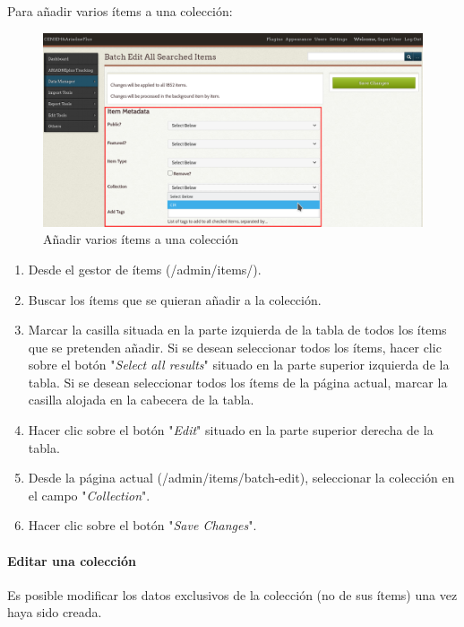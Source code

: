 \documentclass[
]{article}
\providecommand{\tightlist}{%
  \setlength{\itemsep}{0pt}\setlength{\parskip}{0pt}}
\begin{document}
Para añadir varios ítems a una colección:

\begin{figure}
\hypertarget{add-items-collection}{%
\centering
\includegraphics{../_static/images/add-items-collection.png}
\caption{Añadir varios ítems a una
colección}\label{add-items-collection}
}
\end{figure}

\begin{enumerate}
\def\labelenumi{\arabic{enumi}.}
\tightlist
\item
  Desde el gestor de ítems ({/admin/items/}).
\item
  Buscar los ítems que se quieran añadir a la colección.
\item
  Marcar la casilla situada en la parte izquierda de la tabla de todos
  los ítems que se pretenden añadir. Si se desean seleccionar todos los
  ítems, hacer clic sobre el botón "\emph{Select all results}" situado
  en la parte superior izquierda de la tabla. Si se desean seleccionar
  todos los ítems de la página actual, marcar la casilla alojada en la
  cabecera de la tabla.
\item
  Hacer clic sobre el botón "\emph{Edit}" situado en la parte superior
  derecha de la tabla.
\item
  Desde la página actual ({/admin/items/batch-edit}), seleccionar la
  colección en el campo "\emph{Collection}".
\item
  Hacer clic sobre el botón "\emph{Save Changes}".
\end{enumerate}

\hypertarget{editar-una-colecciuxf3n}{%
\paragraph{Editar una colección}\label{editar-una-colecciuxf3n}}

Es posible modificar los datos exclusivos de la colección (no de sus
ítems) una vez haya sido creada.
\end{document}
